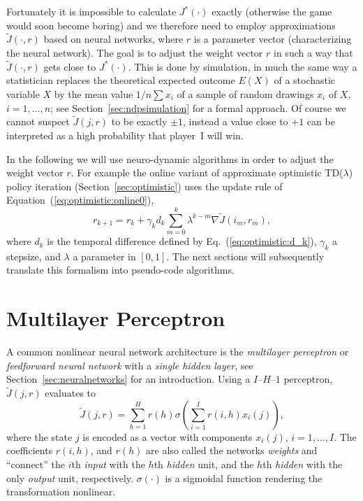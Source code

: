 Fortunately it is impossible to calculate $J^*(\cdot)$ exactly (otherwise the game would soon become boring) and we therefore need to employ approximations $\tilde J(\cdot,r)$ based on neural networks, where $r$ is a parameter vector (characterizing the neural network). The goal is to adjust the weight vector $r$ in such a way that $\tilde J(\cdot,r)$ gets close to $J^*(\cdot)$. 
This is done by simulation, in much the same way a statistician replaces the theoretical expected outcome $E(X)$ of a stochastic variable $X$ by the mean value $1/n\sum x_i$ of a sample of random drawings $x_i$ of $X$, $i=1,\ldots,n$; see Section~\ref{sec:ndpsimulation} for a formal approach. Of course we cannot suspect $\tilde J(j,r)$ to be exactly $\pm1$, instead a value close to $+1$ can be interpreted as a high probability that player~I will win.

In the following we will use neuro-dynamic algorithms in order to adjust the weight vector $r$. For example the online variant of approximate optimistic TD($\lambda$) policy iteration (Section~\ref{sec:optimistic}) uses the update rule of Equation~(\ref{eq:optimistic:online0}),
$$r_{k+1} = r_k + \gamma_k d_k \sum_{m=0}^k \lambda^{k-m} \nabla \tilde J(i_m,r_m),$$
where $d_k$ is the temporal difference defined by Eq.~(\ref{eq:optimistic:d_k}), $\gamma_k$ a stepsize, and $\lambda$ a parameter in $[0,1]$. The next sections will subsequently translate this formalism into pseudo-code algorithms.




\section{Multilayer Perceptron} \label{sec:impl:perceptron}
A common nonlinear neural network architecture is the \emph{multilayer perceptron} or \emph{feedforward neural network} with a \emph{single hidden layer}, see Section~\ref{sec:neuralnetworks} for an introduction. Using a $I$--$H$--$1$ perceptron, $\tilde J(j,r)$ evaluates to 
\begin{equation} \label{eq:perceptron}
\tilde J(j,r) = \sum_{h=1}^H r(h) \sigma\left ( \sum_{i=1}^I r(i,h) x_i(j) \right ), 
\end{equation}
where the state $j$ is encoded as a vector with components $x_i(j)$, $i=1,\ldots,I$. The coefficients $r(i,h)$, and $r(h)$ are also called the networks \emph{weights} and ``connect'' the $i$th \emph{input} with the $h$th \emph{hidden} unit, and the $h$th \emph{hidden} with the only \emph{output} unit, respectively.
$\sigma(\cdot)$ is a sigmoidal function rendering the transformation nonlinear. 

